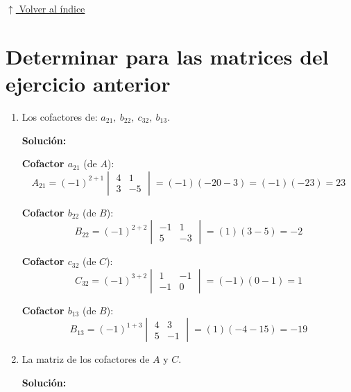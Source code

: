 \documentclass[12pt]{article}
\newcommand{\solucion}{%
    \vspace{0.8em}%
    \textbf{Solución:}%
}
\newcommand{\volverindice}{%
    \vspace{1em}%
    \begin{flushright}%
        \hyperlink{indice}{\small $\uparrow$ Volver al índice}%
    \end{flushright}%
}
\begin{document}
\volverindice

\section{Determinar para las matrices del ejercicio anterior}

\begin{enumerate}[label=\alph*.-]
    \item Los cofactores de: $a_{21},\ b_{22},\ c_{32},\ b_{13}$.

    \solucion

    \textbf{Cofactor $a_{21}$} (de $A$):
    \[
    A_{21} = (-1)^{2+1}\begin{vmatrix}4&1\\3&-5\end{vmatrix}
    = (-1)(-20-3) = (-1)(-23) = 23
    \]

    \textbf{Cofactor $b_{22}$} (de $B$):
    \[
    B_{22} = (-1)^{2+2}\begin{vmatrix}-1&1\\5&-3\end{vmatrix}
    = (1)(3-5) = -2
    \]

    \textbf{Cofactor $c_{32}$} (de $C$):
    \[
    C_{32} = (-1)^{3+2}\begin{vmatrix}1&-1\\-1&0\end{vmatrix}
    = (-1)(0-1) = 1
    \]

    \textbf{Cofactor $b_{13}$} (de $B$):
    \[
    B_{13} = (-1)^{1+3}\begin{vmatrix}4&3\\5&-1\end{vmatrix}
    = (1)(-4-15) = -19
    \]

    \newpage
    \item La matriz de los cofactores de $A$ y $C$.

    \solucion


\end{enumerate}
\end{document}
